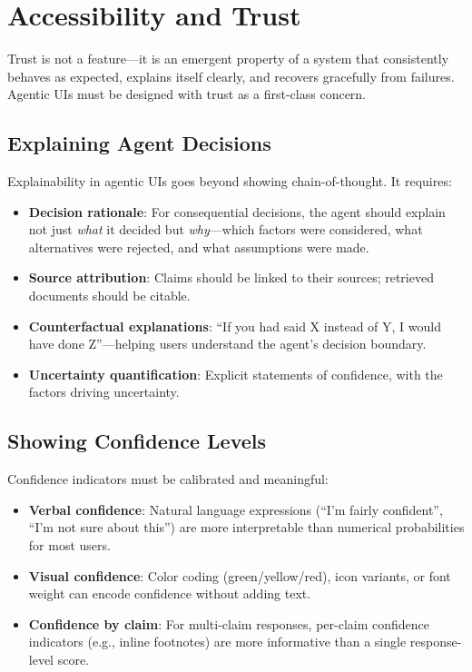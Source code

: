 \section{Accessibility and Trust}
\label{subsec:ui-trust}

Trust is not a feature---it is an emergent property of a system that consistently behaves as expected, explains itself clearly, and recovers gracefully from failures. Agentic UIs must be designed with trust as a first-class concern.

\subsection{Explaining Agent Decisions}
\label{explaining-agent-decisions}

Explainability in agentic UIs goes beyond showing chain-of-thought. It requires:

\begin{itemize}
  \item \textbf{Decision rationale}: For consequential decisions, the agent should explain not just \emph{what} it decided but \emph{why}---which factors were considered, what alternatives were rejected, and what assumptions were made.
  \item \textbf{Source attribution}: Claims should be linked to their sources; retrieved documents should be citable.
  \item \textbf{Counterfactual explanations}: ``If you had said X instead of Y, I would have done Z''---helping users understand the agent’s decision boundary.
  \item \textbf{Uncertainty quantification}: Explicit statements of confidence, with the factors driving uncertainty.
\end{itemize}

\subsection{Showing Confidence Levels}
\label{showing-confidence-levels}

Confidence indicators must be calibrated and meaningful:

\begin{itemize}
  \item \textbf{Verbal confidence}: Natural language expressions (``I’m fairly confident'', ``I’m not sure about this'') are more interpretable than numerical probabilities for most users.
  \item \textbf{Visual confidence}: Color coding (green/yellow/red), icon variants, or font weight can encode confidence without adding text.
  \item \textbf{Confidence by claim}: For multi-claim responses, per-claim confidence indicators (e.g., inline footnotes) are more informative than a single response-level score.
\end{itemize}

